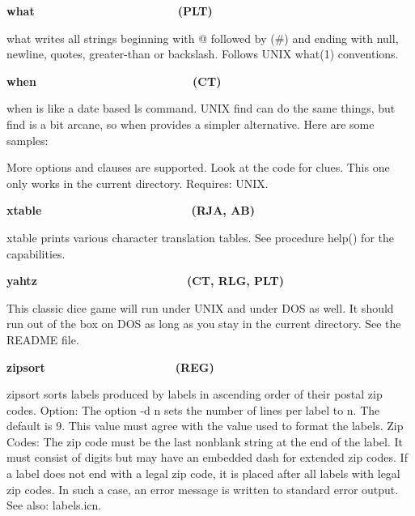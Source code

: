 {\sffamily\bfseries
what\ \ \ \ \ \ \ \ \ \ \ \ \ \ \ \ \ \ \ \ \ \  (PLT)}

\textsf{what} writes all strings beginning with
{\textquotedbl}@{\textquotedbl} followed by
{\textquotedbl}(\#){\textquotedbl} and ending with null, newline,
quotes, greater-than or backslash. Follows UNIX \textsf{what(1)}
conventions.

{\sffamily\bfseries
when\ \ \ \ \ \ \ \ \ \ \ \ \ \ \ \ \ \ \ \ \ \  \ \ (CT)}

\textsf{when} is like a date based \textsf{ls} command. UNIX
\textsf{find} can do the same things, but \textsf{find} is a bit
arcane, so \textsf{when} provides a simpler alternative. Here are some
samples:





More options and clauses are supported. Look at the code for clues. This
one only works in the current directory. Requires: UNIX.

{\sffamily\bfseries
xtable\ \ \ \ \ \ \ \ \ \ \ \ \ \ \ \ \ \ \ \  \ \ \ (RJA, AB)}

\textsf{xtable} prints various character translation tables. See
procedure \textsf{help()} for the capabilities.

{\sffamily\bfseries
yahtz\ \ \ \ \ \ \ \ \ \ \ \ \ \ \ \ \ \  \ \ \ \ \ (CT, RLG, PLT)}

This classic dice game will run under UNIX and under DOS as well. It
should run out of the box on DOS as long as you stay in the current
directory. See the README file.

{\sffamily\bfseries
zipsort\ \ \ \ \ \ \ \ \ \ \ \ \ \ \ \ \ \ \ \ (REG)}

\textsf{zipsort} sorts labels produced by labels in ascending order of
their postal zip codes. Option: The option \textsf{{}-d n} sets the
number of lines per label to n. The default is 9. This value must agree
with the value used to format the labels. Zip Codes: The zip code must
be the last nonblank string at the end of the label. It must consist of
digits but may have an embedded dash for extended zip codes. If a label
does not end with a legal zip code, it is placed after all labels with
legal zip codes. In such a case, an error message is written to
standard error output. See also: \textsf{labels.icn}.

